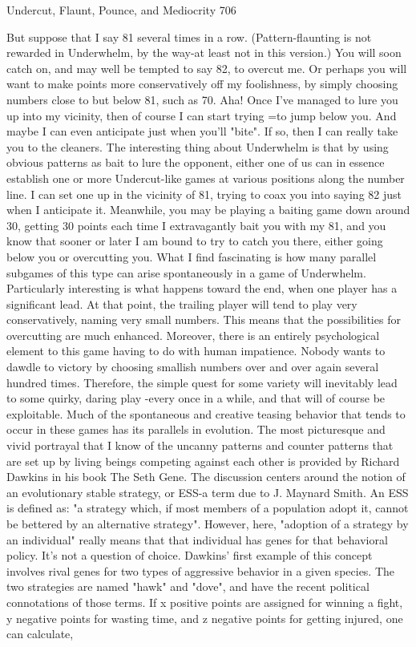 Undercut, Flaunt, Pounce, and Mediocrity                                             706

        But suppose that I say 81 several times in a row. (Pattern-flaunting is not
rewarded in Underwhelm, by the way-at least not in this version.) You will soon catch
on, and may well be tempted to say 82, to overcut me. Or perhaps you will want to
make points more conservatively off my foolishness, by simply choosing numbers
close to but below 81, such as 70. Aha! Once I've managed to lure you up into my
vicinity, then of course I can start trying =to jump below you. And maybe I can even
anticipate just when you'll "bite". If so, then I can really take you to the cleaners.
        The interesting thing about Underwhelm is that by using obvious patterns as
bait to lure the opponent, either one of us can in essence establish one or more
Undercut-like games at various positions along the number line. I can set one up in
the vicinity of 81, trying to coax you into saying 82 just when I anticipate it.
Meanwhile, you may be playing a baiting game down around 30, getting 30 points
each time I extravagantly bait you with my 81, and you know that sooner or later I am
bound to try to catch you there, either going below you or overcutting you.
        What I find fascinating is how many parallel subgames of this type can arise
spontaneously in a game of Underwhelm. Particularly interesting is what happens
toward the end, when one player has a significant lead. At that point, the trailing
player will tend to play very conservatively, naming very small numbers. This means
that the possibilities for overcutting are much enhanced. Moreover, there is an entirely
psychological element to this game having to do with human impatience. Nobody
wants to dawdle to victory by choosing smallish numbers over and over again several
hundred times. Therefore, the simple quest for some variety will inevitably lead to
some quirky, daring play -every once in a while, and that will of course be
exploitable.
        Much of the spontaneous and creative teasing behavior that tends to occur in
these games has its parallels in evolution. The most picturesque and vivid portrayal
that I know of the uncanny patterns and counter patterns that are set up by living
beings competing against each other is provided by Richard Dawkins in his book The
Seth Gene. The discussion centers around the notion of an evolutionary stable
strategy, or ESS-a term due to J. Maynard Smith. An ESS is defined as: "a strategy
which, if most members of a population adopt it, cannot be bettered by an alternative
strategy". However, here, "adoption of a strategy by an individual" really means that
that individual has genes for that behavioral policy. It's not a question of choice.
        Dawkins' first example of this concept involves rival genes for two types of
aggressive behavior in a given species. The two strategies are named "hawk" and
"dove", and have the recent political connotations of those terms. If x positive points
are assigned for winning a fight, y negative points for wasting time, and z negative
points for getting injured, one can calculate,




